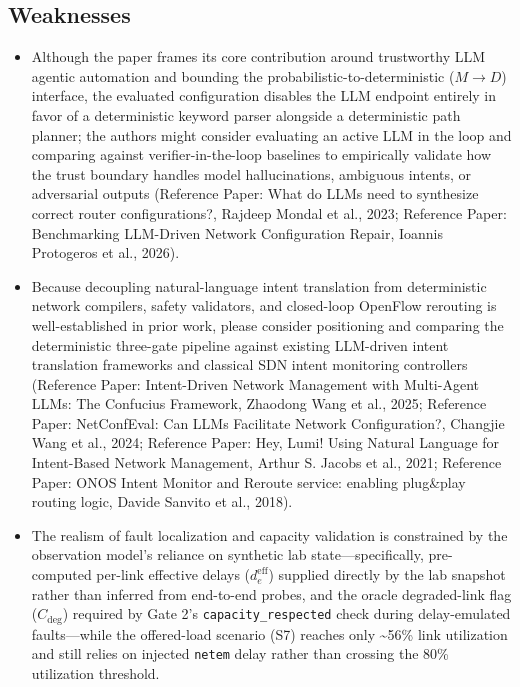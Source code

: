 \documentclass[11pt,a4paper]{article}
\begin{document}
\subsection*{Weaknesses}
\begin{itemize}[leftmargin=1.8em,itemsep=2pt]
\item Although the paper frames its core contribution around trustworthy LLM agentic automation and bounding the probabilistic-to-deterministic ($M \to D$) interface, the evaluated configuration disables the LLM endpoint entirely in favor of a deterministic keyword parser alongside a deterministic path planner; the authors might consider evaluating an active LLM in the loop and comparing against verifier-in-the-loop baselines to empirically validate how the trust boundary handles model hallucinations, ambiguous intents, or adversarial outputs (Reference Paper: What do LLMs need to synthesize correct router configurations?, Rajdeep Mondal et al., 2023; Reference Paper: Benchmarking LLM-Driven Network Configuration Repair, Ioannis Protogeros et al., 2026).
\item Because decoupling natural-language intent translation from deterministic network compilers, safety validators, and closed-loop OpenFlow rerouting is well-established in prior work, please consider positioning and comparing the deterministic three-gate pipeline against existing LLM-driven intent translation frameworks and classical SDN intent monitoring controllers (Reference Paper: Intent-Driven Network Management with Multi-Agent LLMs: The Confucius Framework, Zhaodong Wang et al., 2025; Reference Paper: NetConfEval: Can LLMs Facilitate Network Configuration?, Changjie Wang et al., 2024; Reference Paper: Hey, Lumi! Using Natural Language for Intent-Based Network Management, Arthur S. Jacobs et al., 2021; Reference Paper: ONOS Intent Monitor and Reroute service: enabling plug\&play routing logic, Davide Sanvito et al., 2018).
\item The realism of fault localization and capacity validation is constrained by the observation model's reliance on synthetic lab state—specifically, pre-computed per-link effective delays ($d_e^{\text{eff}}$) supplied directly by the lab snapshot rather than inferred from end-to-end probes, and the oracle degraded-link flag ($C_{\text{deg}}$) required by Gate 2's \texttt{capacity\_respected} check during delay-emulated faults—while the offered-load scenario (S7) reaches only \textasciitilde{}56\% link utilization and still relies on injected \texttt{netem} delay rather than crossing the 80\% utilization threshold.

\end{itemize}
\end{document}
